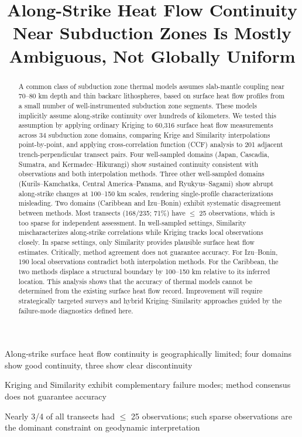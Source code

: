 \documentclass[draft,linenumbers]{agujournal2019}
\begin{document}
\title{Along-Strike Heat Flow Continuity Near Subduction Zones Is Mostly
Ambiguous, Not Globally Uniform}




\begin{keypoints}
\item Along-strike surface heat flow continuity is geographically
limited; four domains show good continuity, three show clear
discontinuity
\item Kriging and Similarity exhibit complementary failure modes; method
consensus does not guarantee accuracy
\item Nearly 3/4 of all transects had \(\leq\) 25 observations; such
sparse observations are the dominant constraint on geodynamic
interpretation
\end{keypoints}

\begin{abstract}
A common class of subduction zone thermal models assumes slab-mantle
coupling near 70--80 km depth and thin backarc lithospheres, based on
surface heat flow profiles from a small number of well-instrumented
subduction zone segments. These models implicitly assume along-strike
continuity over hundreds of kilometers. We tested this assumption by
applying ordinary Kriging to 60,316 surface heat flow measurements
across 34 subduction zone domains, comparing Krige and Similarity
interpolations point-by-point, and applying cross-correlation function
(CCF) analysis to 201 adjacent trench-perpendicular transect pairs. Four
well-sampled domains (Japan, Cascadia, Sumatra, and Kermadec--Hikurangi)
show sustained continuity consistent with observations and both
interpolation methods. Three other well-sampled domains
(Kurils--Kamchatka, Central America--Panama, and Ryukyus--Sagami) show
abrupt along-strike changes at 100--150 km scales, rendering
single-profile characterizations misleading. Two domains (Caribbean and
Izu--Bonin) exhibit systematic disagreement between methods. Most
transects (168/235; 71\%) have \(\leq\) 25 observations, which is too
sparse for independent assessment. In well-sampled settings, Similarity
mischaracterizes along-strike correlations while Kriging tracks local
observations closely. In sparse settings, only Similarity provides
plausible surface heat flow estimates. Critically, method agreement does
not guarantee accuracy. For Izu--Bonin, 190 local observations
contradict both interpolation methods. For the Caribbean, the two
methods displace a structural boundary by 100--150 km relative to its
inferred location. This analysis shows that the accuracy of thermal
models cannot be determined from the existing surface heat flow record.
Improvement will require strategically targeted surveys and hybrid
Kriging--Similarity approaches guided by the failure-mode diagnostics
defined here.
\end{abstract}
\end{document}
